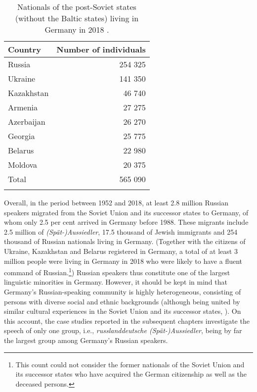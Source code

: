\begin{table}
\begin{tabular}{l r}
	\lsptoprule
			Country	&Number of individuals \\
			\midrule
			Russia	&254 325\\
			Ukraine	&141 350\\
			Kazakhstan &46 740\\
			Armenia &27 275\\
			Azerbaijan &26 270\\
			Georgia &25 775\\
			Belarus &22 980\\
            Moldova &20 375\\
			Total &565 090\\
			\lspbottomrule
\end{tabular}
\caption{Nationals of the post-Soviet states (without the Baltic states) living in Germany in 2018 \citep[adopted from][276--278]{bamf}.\label{tab:3:1}}
\end{table}

Overall, in the period between 1952 and 2018, at least 2.8 million Russian speakers migrated from the Soviet Union and its successor states to Germany, of whom only 2.5 per cent arrived in Germany before 1988. These migrants include 2.5 million of \textit{(Spät-)Aussiedler}, 17.5 thousand of Jewish immigrants and 254 thousand of Russian nationals living in Germany. (Together with the citizens of Ukraine, Kazakhstan and Belarus registered in Germany, a total of at least 3 million people were living in Germany in 2018 who were likely to have a fluent command of Russian.\footnote{This count could not consider the former nationals of the Soviet Union and its successor states who have acquired the German citizenship as well as the deceased persons.}) Russian speakers thus constitute one of the largest linguistic minorities in Germany. However, it should be kept in mind that Germany's Russian-speaking community is highly heterogeneous, consisting of persons with diverse social and ethnic backgrounds (although being united by similar cultural experiences in the Soviet Union and its successor states, \citealt[cf.][]{gasimov-paper, levkovych}). On this account, the case studies reported in the subsequent chapters investigate the speech of only one group, i.e., \textit{russlanddeutsche (Spät-)Aussiedler}, being by far the largest group among Germany's Russian speakers.

